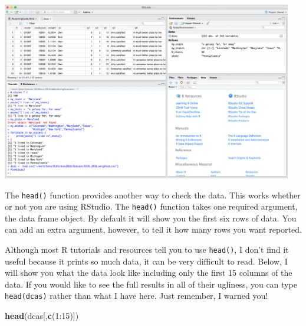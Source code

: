 \documentclass[]{article}
\newenvironment{Shaded}{\begin{snugshade}}{\end{snugshade}}
\newcommand{\KeywordTok}[1]{\textcolor[rgb]{0.13,0.29,0.53}{\textbf{{#1}}}}
\newcommand{\DecValTok}[1]{\textcolor[rgb]{0.00,0.00,0.81}{{#1}}}
\newcommand{\NormalTok}[1]{{#1}}
\begin{document}
\includegraphics[width=5in]{images/View_function_screenshot}

The \texttt{head()} function provides another way to check the data.
This works whether or not you are using RStudio. The \texttt{head()}
function takes one required argument, the data frame object. By default
it will show you the first six rows of data. You can add an extra
argument, however, to tell it how many rows you want reported.

Although most R tutorials and resources tell you to use \texttt{head()},
I don't find it useful because it prints so much data, it can be very
difficult to read. Below, I will show you what the data look like
including only the first 15 columns of the data. If you would like to
see the full results in all of their ugliness, you can type
\texttt{head(dcas)} rather than what I have here. Just remember, I
warned you!

\begin{Shaded}
\begin{Highlighting}[]
\KeywordTok{head}\NormalTok{(dcas[,}\KeywordTok{c}\NormalTok{(}\DecValTok{1}\NormalTok{:}\DecValTok{15}\NormalTok{)])}
\end{Highlighting}
\end{Shaded}
\end{document}
